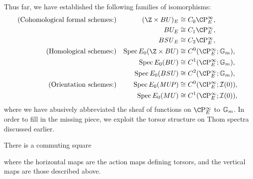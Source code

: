 Thus far, we have established the following families of isomorphisms:
\begin{align*}
\text{(Cohomological formal schemes:)} & &
    (\Z \times BU)_E & \cong C_0 \CP^\infty_E, \\
& & BU_E & \cong C_1 \CP^\infty_E, \\
& & B\SU_E & \cong C_2 \CP^\infty_E, \\
\text{(Homological schemes:)} & &
    \Spec E_0(\Z \times BU) & \cong C^0(\CP^\infty_E; \Gm), \\
& & \Spec E_0(BU) & \cong C^1(\CP^\infty_E; \Gm), \\
& & \Spec E_0(B\SU) & \cong C^2(\CP^\infty_E; \Gm), \\
\text{(Orientation schemes:)} & &
    \Spec E_0(\MUP) & \cong C^0(\CP^\infty_E; \sheaf I(0)), \\
& & \Spec E_0(MU) & \cong C^1(\CP^\infty_E; \sheaf I(0)),
\end{align*}
where we have abusively abbreviated the sheaf of functions on \(\CP^\infty_E\) to \(\mathbb G_m\).  In order to fill in the missing piece, we exploit the torsor structure on Thom spectra discussed earlier.
\begin{lemma}\label{MSUIsATorsor}
There is a commuting square
\begin{center}
\end{center}
where the horizontal maps are the action maps defining torsors, and the vertical maps are those described above.
\end{lemma}

